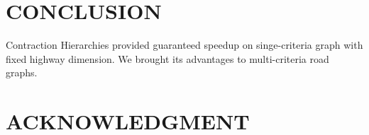 

\section{CONCLUSION}
Contraction Hierarchies provided guaranteed speedup on singe-criteria graph
with fixed highway dimension. We brought its advantages to multi-criteria 
road graphs.


\section*{ACKNOWLEDGMENT}







\newpage



